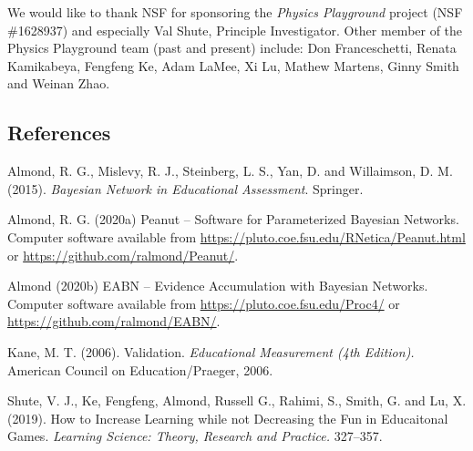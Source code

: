 \documentclass[]{article}
\begin{document}
We would like to thank NSF for sponsoring the \emph{Physics Playground}
project (NSF \#1628937) and especially Val Shute, Principle
Investigator. Other member of the Physics Playground team (past and
present) include: Don Franceschetti, Renata Kamikabeya, Fengfeng Ke,
Adam LaMee, Xi Lu, Mathew Martens, Ginny Smith and Weinan Zhao.

\subsection{References}\label{references}

Almond, R. G., Mislevy, R. J., Steinberg, L. S., Yan, D. and Willaimson,
D. M. (2015). \emph{Bayesian Network in Educational Assessment}.
Springer.

Almond, R. G. (2020a) Peanut -- Software for Parameterized Bayesian
Networks. Computer software available from
\url{https://pluto.coe.fsu.edu/RNetica/Peanut.html} or
\url{https://github.com/ralmond/Peanut/}.

Almond (2020b) EABN -- Evidence Accumulation with Bayesian Networks.
Computer software available from \url{https://pluto.coe.fsu.edu/Proc4/}
or \url{https://github.com/ralmond/EABN/}.

Kane, M. T. (2006). Validation. \emph{Educational Measurement (4th
Edition).} American Council on Education/Praeger, 2006.

Shute, V. J., Ke, Fengfeng, Almond, Russell G., Rahimi, S., Smith, G.
and Lu, X. (2019). How to Increase Learning while not Decreasing the Fun
in Educaitonal Games. \emph{Learning Science: Theory, Research and
Practice.} 327--357.
\end{document}
